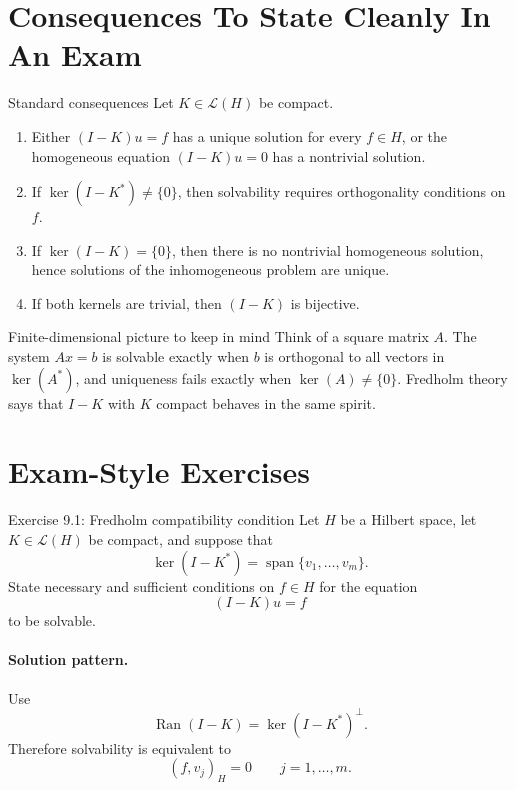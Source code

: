 \documentclass[header={Lecture 9 Exam Study Notes}]{study-note}
\begin{document}
\section{Consequences To State Cleanly In An Exam}

\begin{thmbox}{Standard consequences}
Let $K\in\mathcal L(H)$ be compact.
\begin{enumerate}
\item Either $(I-K)u=f$ has a unique solution for every $f\in H$, or the homogeneous equation $(I-K)u=0$ has a nontrivial solution.
\item If $\ker(I-K^*)\neq\{0\}$, then solvability requires orthogonality conditions on $f$.
\item If $\ker(I-K)=\{0\}$, then there is no nontrivial homogeneous solution, hence solutions of the inhomogeneous problem are unique.
\item If both kernels are trivial, then $(I-K)$ is bijective.
\end{enumerate}
\end{thmbox}

\begin{exbox}{Finite-dimensional picture to keep in mind}
Think of a square matrix $A$. The system $Ax=b$ is solvable exactly when $b$ is orthogonal to all vectors in $\ker(A^*)$, and uniqueness fails exactly when $\ker(A)\neq\{0\}$. Fredholm theory says that $I-K$ with $K$ compact behaves in the same spirit.
\end{exbox}

\section{Exam-Style Exercises}

\begin{exbox}{Exercise 9.1: Fredholm compatibility condition}
Let $H$ be a Hilbert space, let $K\in\mathcal L(H)$ be compact, and suppose that
\[
\ker(I-K^*)=\operatorname{span}\{v_1,\dots,v_m\}.
\]
State necessary and sufficient conditions on $f\in H$ for the equation
\[
(I-K)u=f
\]
to be solvable.

\paragraph{Solution pattern.}
Use
\[
\operatorname{Ran}(I-K)=\ker(I-K^*)^{\perp}.
\]
Therefore solvability is equivalent to
\[
(f,v_j)_H=0 \qquad j=1,\dots,m.
\]
\end{exbox}
\end{document}
